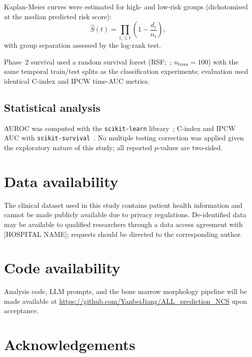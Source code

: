 \documentclass[pdflatex,sn-nature]{sn-jnl}
\begin{document}
Kaplan-Meier curves were estimated for high- and low-risk groups
(dichotomised at the median predicted risk score):
\begin{equation}
\hat{S}(t) = \prod_{t_i \leq t}
\left(1 - \frac{d_i}{n_i}\right),
\label{eq:km}
\end{equation}
with group separation assessed by the log-rank test.

Phase~2 survival used a random survival forest
(RSF;~\cite{[CITE:Ishwaran2008]}; $n_{\text{trees}}=100$) with the
same temporal train/test splits as the classification experiments;
evaluation used identical C-index and IPCW time-AUC metrics.

\subsection{Statistical analysis}

AUROC was computed with the \texttt{scikit-learn}
library~\cite{[CITE:sklearn]}; C-index and IPCW AUC with
\texttt{scikit-survival}~\cite{[CITE:sksurv]}.
No multiple testing correction was applied given the exploratory
nature of this study; all reported $p$-values are two-sided.

\section*{Data availability}

The clinical dataset used in this study contains patient health
information and cannot be made publicly available due to privacy
regulations.
De-identified data may be available to qualified researchers through a
data access agreement with [HOSPITAL NAME]; requests should be
directed to the corresponding author.

\section*{Code availability}

Analysis code, LLM prompts, and the bone marrow morphology pipeline
will be made available at \url{https://github.com/YanbeiJiang/ALL_prediction_NCS}
upon acceptance.

\section*{Acknowledgements}
\end{document}
